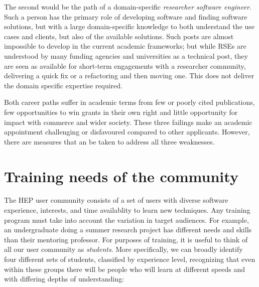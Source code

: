 \documentclass[12pt,a4paper]{article}
\begin{document}
The second would be the path of a domain-specific \emph{researcher software
engineer}. Such a person has the primary role of developing software and finding
software solutions, but with a large domain-specific knowledge to both
understand the use cases and clients, but also of the available solutions.  Such
posts are almost impossible to develop in the current academic frameworks; but
while RSEs are understood by many funding agencies and universities as a
technical post, they are seen as available for short-term engagements with a
researcher community, delivering a quick fix or a refactoring and then moving
one. This does not deliver the domain specific expertise required.

Both career paths suffer in academic terms from few or poorly cited
publications, few opportunities to win grants in their own right and little
opportunity for impact with commerce and wider society. These three failings
make an academic appointment challenging or disfavoured compared to other
applicants. However, there are measures that an be taken to address all three
weaknesses.




\section{Training needs of the community}


The HEP user community consists of a set of users with diverse software
experience, interests, and time availablity to learn new techniques.  Any
training program must take into account the variation in target audiences. For
example, an undergraduate doing a summer research project has different needs
and skills than their mentoring professor.
For purposes of training, it is useful to think of all our user community as
\emph{students}. More specifically, we can broadly identify four different sets
of students, classified by experience level, recognizing that even within these
groups there will be people who will learn at different speeds and with
differing depths of understanding:
\end{document}
